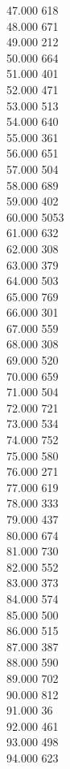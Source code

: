 { 47.000	618 \\
 48.000	671 \\
 49.000	212 \\
 50.000	664 \\
 51.000	401 \\
 52.000	471 \\
 53.000	513 \\
 54.000	640 \\
 55.000	361 \\
 56.000	651 \\
 57.000	504 \\
 58.000	689 \\
 59.000	402 \\
 60.000	5053 \\
 61.000	632 \\
 62.000	308 \\
 63.000	379 \\
 64.000	503 \\
 65.000	769 \\
 66.000	301 \\
 67.000	559 \\
 68.000	308 \\
 69.000	520 \\
 70.000	659 \\
 71.000	504 \\
 72.000	721 \\
 73.000	534 \\
 74.000	752 \\
 75.000	580 \\
 76.000	271 \\
 77.000	619 \\
 78.000	333 \\
 79.000	437 \\
 80.000	674 \\
 81.000	730 \\
 82.000	552 \\
 83.000	373 \\
 84.000	574 \\
 85.000	500 \\
 86.000	515 \\
 87.000	387 \\
 88.000	590 \\
 89.000	702 \\
 90.000	812 \\
 91.000	36 \\
 92.000	461 \\
 93.000	498 \\
 94.000	623 \\
}
